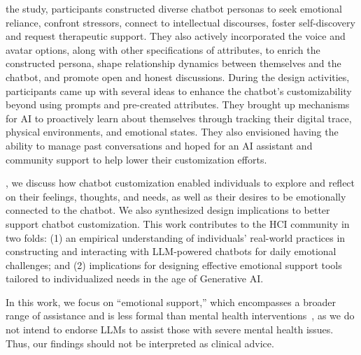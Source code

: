  the study, participants constructed diverse chatbot personas to seek emotional reliance, confront stressors, connect to intellectual discourses, foster self-discovery and request therapeutic support. They also actively incorporated the voice and avatar options, along with other specifications of attributes, to enrich the constructed persona, shape relationship dynamics between themselves and the chatbot, and promote open and honest discussions. 
During the  design activities, participants came up with several ideas to enhance the chatbot's customizability beyond using prompts and pre-created attributes. They brought up mechanisms for AI to proactively learn about themselves through tracking their digital trace, physical environments, and emotional states. They also envisioned having the ability to manage past conversations and hoped for an AI assistant and community support to help lower their customization efforts.

, we discuss how chatbot customization enabled individuals to explore and reflect on their feelings, thoughts, and needs, as well as their desires to be emotionally connected to the chatbot. We also synthesized design implications to better support chatbot customization. 
This work contributes to the HCI community in two folds: (1) an empirical understanding of individuals' real-world practices in constructing and interacting with LLM-powered chatbots for daily emotional challenges; and (2) implications for designing effective emotional support tools tailored to individualized needs in the age of Generative AI.

In this work, we focus on ``emotional support,'' which encompasses a broader range of  assistance  and is less formal than mental health interventions~\cite{webMD2024}, as we do not intend to endorse LLMs to assist those with severe mental health issues. Thus, our findings should not be interpreted as clinical advice. 

